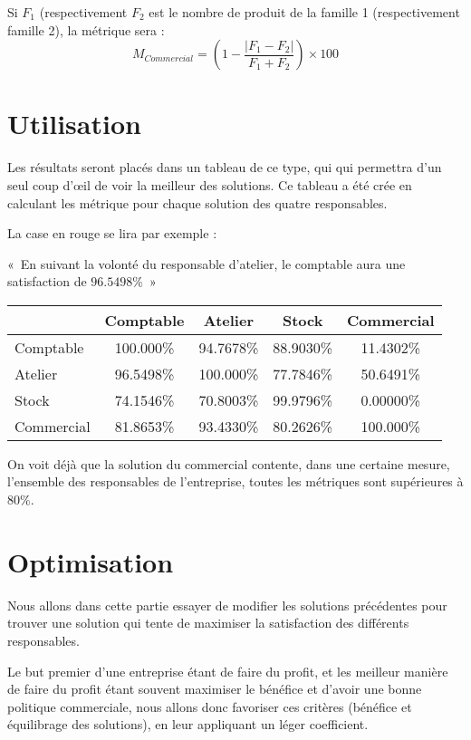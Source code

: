 Si $F_1$ (respectivement $F_2$ est le nombre de produit de la famille 1
(respectivement famille 2), la métrique sera :
$$
M_{Commercial} = \left( 1 - \frac{|F_1 - F_2|}{F_1 + F_2} \right) \times 100
$$

\section{Utilisation}
Les résultats seront placés dans un tableau de ce type, qui qui permettra d'un
seul coup d'œil de voir la meilleur des solutions. Ce tableau a été crée en
calculant les métrique pour chaque solution des quatre responsables.

La case en rouge se lira par exemple : 

\begin{center}
«~En suivant la volonté du responsable d'atelier, le comptable aura une
satisfaction de $96.5498\%$~»
\end{center}

    \begin{center}
	\begin{tabular}{|l|c|c|c|c|}
	    \hline
	    \cellcolor[gray]{0.9} & Comptable& Atelier & Stock & Commercial  \\
	    \hline
	    Comptable & 100.000\% & 94.7678\% & 88.9030\% & 11.4302\% \\
	    \hline
	    Atelier   & \cellcolor{red}96.5498\% & 100.000\% & 77.7846\% & 50.6491\% \\
	    \hline
	    Stock     & 74.1546\% & 70.8003\% & 99.9796\% & 0.00000\% \\
	    \hline
	    Commercial& 81.8653\% & 93.4330\% & 80.2626\% & 100.000\% \\
	    \hline
	\end{tabular}
    \end{center}

On voit déjà que la solution du commercial contente, dans une certaine mesure,
l'ensemble des responsables de l'entreprise, toutes les métriques sont
supérieures à 80\%.

\section{Optimisation}
Nous allons dans cette partie essayer de modifier les solutions précédentes
pour trouver une solution qui tente de maximiser la satisfaction des différents
responsables.

Le but premier d'une entreprise étant de faire du profit, et les meilleur 
manière de faire du profit étant souvent maximiser le bénéfice et d'avoir une
bonne politique commerciale, nous allons donc favoriser ces critères (bénéfice et
équilibrage des solutions), en leur appliquant un léger coefficient.

